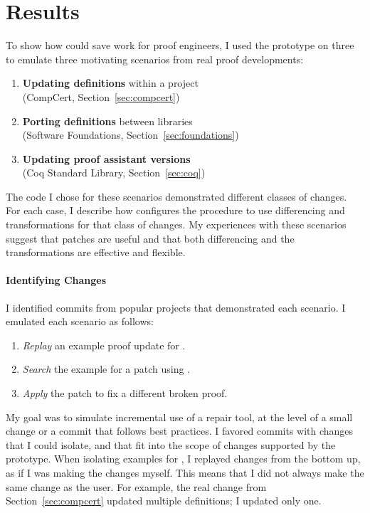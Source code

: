 \section{Results}
\label{sec:pumpkin-results}



To show how \sysname could save work for proof engineers, I used the \sysname prototype on three  to emulate three motivating scenarios from real proof developments:

\begin{enumerate}
\item \textbf{Updating definitions} within a project \\
(CompCert, Section~\ref{sec:compcert})
\item \textbf{Porting definitions} between libraries \\
(Software Foundations, Section~\ref{sec:foundations})
\item \textbf{Updating proof assistant versions} \\
(Coq Standard Library, Section~\ref{sec:coq})
\end{enumerate}
The code I chose for these scenarios demonstrated different classes of changes.
For each case, I describe how \sysname configures the procedure to use differencing and transformations for that class of changes.
My experiences with these scenarios suggest that patches are useful and that both differencing and the transformations 
are effective and flexible.

\paragraph{Identifying Changes} I identified commits from popular projects that
demonstrated each scenario.
I emulated each scenario as follows:

\begin{enumerate}
\item \textit{Replay} an example proof update for \sysname.
\item \textit{Search} the example for a patch using \sysname.
\item \textit{Apply} the patch to fix a different broken proof.
\end{enumerate}
My goal was to simulate incremental use of a repair tool,
at the level of a small change or a commit that follows best practices.
I favored commits with changes that I could isolate,
and that fit into the scope of changes supported by the \sysname prototype.
When isolating examples for \sysname, I replayed changes from the bottom up,
as if I was making the changes myself.
This means that I did not always make the same change as the user. For example,
the real change from Section~\ref{sec:compcert} updated multiple definitions;
I updated only one.

